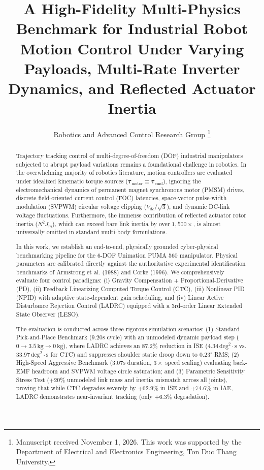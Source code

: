 \documentclass[journal,10pt,twocolumn]{IEEEtran}
\begin{document}
\title{A High-Fidelity Multi-Physics Benchmark for Industrial Robot Motion Control Under Varying Payloads, Multi-Rate Inverter Dynamics, and Reflected Actuator Inertia}

\author{Robotics and Advanced Control Research Group%
\thanks{Manuscript received November 1, 2026. This work was supported by the Department of Electrical and Electronics Engineering, Ton Duc Thang University.}%
}

\maketitle

\begin{abstract}
Trajectory tracking control of multi-degree-of-freedom (DOF) industrial manipulators subjected to abrupt payload variations remains a foundational challenge in robotics. In the overwhelming majority of robotics literature, motion controllers are evaluated under idealized kinematic torque sources ($\bm{\tau}_{\text{motor}} \equiv \bm{\tau}_{\text{cmd}}$), ignoring the electromechanical dynamics of permanent magnet synchronous motor (PMSM) drives, discrete field-oriented current control (FOC) latencies, space-vector pulse-width modulation (SVPWM) circular voltage clipping ($V_{dc}/\sqrt{3}$), and dynamic DC-link voltage fluctuations. Furthermore, the immense contribution of reflected actuator rotor inertia ($N^2 J_m$), which can exceed bare link inertia by over $1,500\times$, is almost universally omitted in standard multi-body formulations.

In this work, we establish an end-to-end, physically grounded cyber-physical benchmarking pipeline for the 6-DOF Unimation PUMA 560 manipulator. Physical parameters are calibrated directly against the authoritative experimental identification benchmarks of Armstrong et al. (1988) and Corke (1996). We comprehensively evaluate four control paradigms: (i) Gravity Compensation + Proportional-Derivative (PD), (ii) Feedback Linearizing Computed Torque Control (CTC), (iii) Nonlinear PID (NPID) with adaptive state-dependent gain scheduling, and (iv) Linear Active Disturbance Rejection Control (LADRC) equipped with a 3rd-order Linear Extended State Observer (LESO).

The evaluation is conducted across three rigorous simulation scenarios: (1) Standard Pick-and-Place Benchmark (9.20s cycle) with an unmodeled dynamic payload step ($0 \to 3.5\,\text{kg} \to 0\,\text{kg}$), where LADRC achieves an 87.2\% reduction in ISE ($4.34\,\text{deg}^2\cdot\text{s}$ vs. $33.97\,\text{deg}^2\cdot\text{s}$ for CTC) and suppresses shoulder static droop down to $0.23^\circ$ RMS; (2) High-Speed Aggressive Benchmark (3.07s duration, $3\times$ speed scaling) evaluating back-EMF headroom and SVPWM voltage circle saturation; and (3) Parametric Sensitivity Stress Test ($+20\%$ unmodeled link mass and inertia mismatch across all joints), proving that while CTC degrades severely by $+62.9\%$ in ISE and $+74.6\%$ in IAE, LADRC demonstrates near-invariant tracking (only $+6.3\%$ degradation).
\end{abstract}
\end{document}
